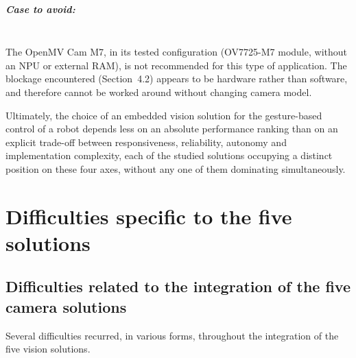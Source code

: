 \documentclass[12pt,a4paper]{report}
\begin{document}
	\paragraph{Case to avoid:} \mbox{} \\ 
	The OpenMV Cam M7, in its tested configuration (OV7725-M7 module, without an NPU or external RAM), is not recommended for this type of application. The blockage encountered (Section~4.2) appears to be hardware rather than software, and therefore cannot be worked around without changing camera model.
	
	\medskip
	
	Ultimately, the choice of an embedded vision solution for the gesture-based control of a robot depends less on an absolute performance ranking than on an explicit trade-off between responsiveness, reliability, autonomy and implementation complexity, each of the studied solutions occupying a distinct position on these four axes, without any one of them dominating simultaneously.
	
	\newpage
	
	
\chapter{Difficulties specific to the five solutions}
	\section*{Difficulties related to the integration of the five camera solutions}
	
	Several difficulties recurred, in various forms, throughout the integration of the five vision solutions.
	
\end{document}
